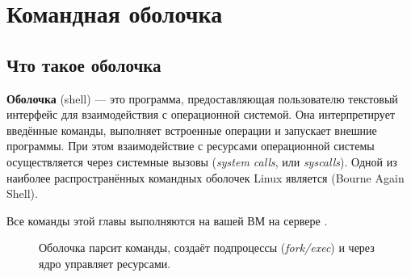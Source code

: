 \chapter{Командная оболочка}
\label{ch:03-shell}

\section{Что такое оболочка}

\textbf{Оболочка} (shell) --- это программа, предоставляющая
пользователю текстовый интерфейс для взаимодействия с операционной
системой. Она интерпретирует введённые команды, выполняет встроенные
операции и запускает внешние программы. При этом взаимодействие
с ресурсами операционной системы осуществляется через системные
вызовы (\emph{system calls}, или \emph{syscalls}).
Одной из наиболее распространённых командных оболочек Linux
является  (Bourne Again Shell).

\begin{sloppypar}
Все команды этой главы выполняются на вашей ВМ на сервере
.
\end{sloppypar}

\begin{figure}[htb]
  \centering
  \caption{Оболочка парсит команды, создаёт подпроцессы
    (\emph{fork/exec}) и через ядро управляет ресурсами.}
  \label{fig:shell-kernel}
\end{figure}

